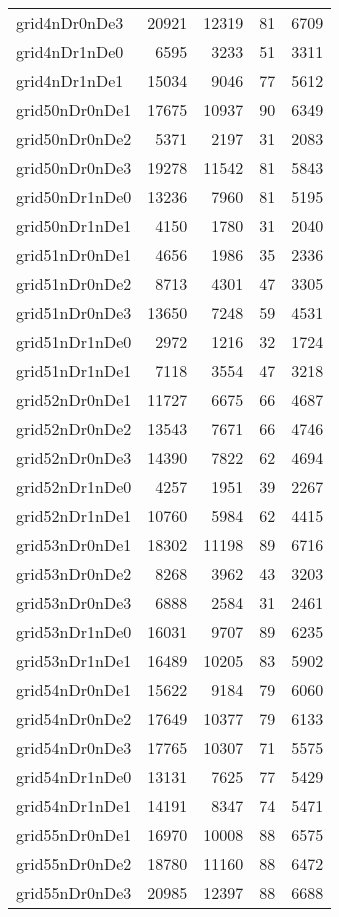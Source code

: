\begin{longtable}{lrrrr}
grid4nDr0nDe3 & 20921 & 12319 & 81 & 6709 \\
grid4nDr1nDe0 & 6595 & 3233 & 51 & 3311 \\
grid4nDr1nDe1 & 15034 & 9046 & 77 & 5612 \\
grid50nDr0nDe1 & 17675 & 10937 & 90 & 6349 \\
grid50nDr0nDe2 & 5371 & 2197 & 31 & 2083 \\
grid50nDr0nDe3 & 19278 & 11542 & 81 & 5843 \\
grid50nDr1nDe0 & 13236 & 7960 & 81 & 5195 \\
grid50nDr1nDe1 & 4150 & 1780 & 31 & 2040 \\
grid51nDr0nDe1 & 4656 & 1986 & 35 & 2336 \\
grid51nDr0nDe2 & 8713 & 4301 & 47 & 3305 \\
grid51nDr0nDe3 & 13650 & 7248 & 59 & 4531 \\
grid51nDr1nDe0 & 2972 & 1216 & 32 & 1724 \\
grid51nDr1nDe1 & 7118 & 3554 & 47 & 3218 \\
grid52nDr0nDe1 & 11727 & 6675 & 66 & 4687 \\
grid52nDr0nDe2 & 13543 & 7671 & 66 & 4746 \\
grid52nDr0nDe3 & 14390 & 7822 & 62 & 4694 \\
grid52nDr1nDe0 & 4257 & 1951 & 39 & 2267 \\
grid52nDr1nDe1 & 10760 & 5984 & 62 & 4415 \\
grid53nDr0nDe1 & 18302 & 11198 & 89 & 6716 \\
grid53nDr0nDe2 & 8268 & 3962 & 43 & 3203 \\
grid53nDr0nDe3 & 6888 & 2584 & 31 & 2461 \\
grid53nDr1nDe0 & 16031 & 9707 & 89 & 6235 \\
grid53nDr1nDe1 & 16489 & 10205 & 83 & 5902 \\
grid54nDr0nDe1 & 15622 & 9184 & 79 & 6060 \\
grid54nDr0nDe2 & 17649 & 10377 & 79 & 6133 \\
grid54nDr0nDe3 & 17765 & 10307 & 71 & 5575 \\
grid54nDr1nDe0 & 13131 & 7625 & 77 & 5429 \\
grid54nDr1nDe1 & 14191 & 8347 & 74 & 5471 \\
grid55nDr0nDe1 & 16970 & 10008 & 88 & 6575 \\
grid55nDr0nDe2 & 18780 & 11160 & 88 & 6472 \\
grid55nDr0nDe3 & 20985 & 12397 & 88 & 6688 \\

\end{longtable}

